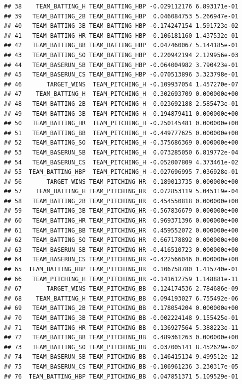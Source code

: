 \documentclass[
]{article}
\begin{document}
\begin{verbatim}
## 38    TEAM_BATTING_H TEAM_BATTING_HBP -0.029112176 6.893171e-01
## 39   TEAM_BATTING_2B TEAM_BATTING_HBP  0.046084753 5.266947e-01
## 40   TEAM_BATTING_3B TEAM_BATTING_HBP -0.174247154 1.591723e-02
## 41   TEAM_BATTING_HR TEAM_BATTING_HBP  0.106181160 1.437532e-01
## 42   TEAM_BATTING_BB TEAM_BATTING_HBP  0.047460067 5.144185e-01
## 43   TEAM_BATTING_SO TEAM_BATTING_HBP  0.220942194 2.129956e-03
## 44   TEAM_BASERUN_SB TEAM_BATTING_HBP -0.064004982 3.790423e-01
## 45   TEAM_BASERUN_CS TEAM_BATTING_HBP -0.070513896 3.323798e-01
## 46       TARGET_WINS  TEAM_PITCHING_H -0.109937054 1.457270e-07
## 47    TEAM_BATTING_H  TEAM_PITCHING_H  0.302693709 0.000000e+00
## 48   TEAM_BATTING_2B  TEAM_PITCHING_H  0.023692188 2.585473e-01
## 49   TEAM_BATTING_3B  TEAM_PITCHING_H  0.194879411 0.000000e+00
## 50   TEAM_BATTING_HR  TEAM_PITCHING_H -0.250145481 0.000000e+00
## 51   TEAM_BATTING_BB  TEAM_PITCHING_H -0.449777625 0.000000e+00
## 52   TEAM_BATTING_SO  TEAM_PITCHING_H -0.375686369 0.000000e+00
## 53   TEAM_BASERUN_SB  TEAM_PITCHING_H  0.073285050 6.819772e-04
## 54   TEAM_BASERUN_CS  TEAM_PITCHING_H -0.052007809 4.373461e-02
## 55  TEAM_BATTING_HBP  TEAM_PITCHING_H -0.027696995 7.036928e-01
## 56       TARGET_WINS TEAM_PITCHING_HR  0.189013735 0.000000e+00
## 57    TEAM_BATTING_H TEAM_PITCHING_HR  0.072853119 5.045119e-04
## 58   TEAM_BATTING_2B TEAM_PITCHING_HR  0.454550818 0.000000e+00
## 59   TEAM_BATTING_3B TEAM_PITCHING_HR -0.567836679 0.000000e+00
## 60   TEAM_BATTING_HR TEAM_PITCHING_HR  0.969371396 0.000000e+00
## 61   TEAM_BATTING_BB TEAM_PITCHING_HR  0.459552072 0.000000e+00
## 62   TEAM_BATTING_SO TEAM_PITCHING_HR  0.667178892 0.000000e+00
## 63   TEAM_BASERUN_SB TEAM_PITCHING_HR -0.416510723 0.000000e+00
## 64   TEAM_BASERUN_CS TEAM_PITCHING_HR -0.422566046 0.000000e+00
## 65  TEAM_BATTING_HBP TEAM_PITCHING_HR  0.106758780 1.415740e-01
## 66   TEAM_PITCHING_H TEAM_PITCHING_HR -0.141612759 1.148881e-11
## 67       TARGET_WINS TEAM_PITCHING_BB  0.124174536 2.784686e-09
## 68    TEAM_BATTING_H TEAM_PITCHING_BB  0.094193027 6.755492e-06
## 69   TEAM_BATTING_2B TEAM_PITCHING_BB  0.178054204 0.000000e+00
## 70   TEAM_BATTING_3B TEAM_PITCHING_BB -0.002224148 9.155425e-01
## 71   TEAM_BATTING_HR TEAM_PITCHING_BB  0.136927564 5.388223e-11
## 72   TEAM_BATTING_BB TEAM_PITCHING_BB  0.489361263 0.000000e+00
## 73   TEAM_BATTING_SO TEAM_PITCHING_BB  0.037005141 8.452629e-02
## 74   TEAM_BASERUN_SB TEAM_PITCHING_BB  0.146415134 9.499512e-12
## 75   TEAM_BASERUN_CS TEAM_PITCHING_BB -0.106961236 3.230317e-05
## 76  TEAM_BATTING_HBP TEAM_PITCHING_BB  0.047851371 5.109529e-01

\end{verbatim}
\end{document}
